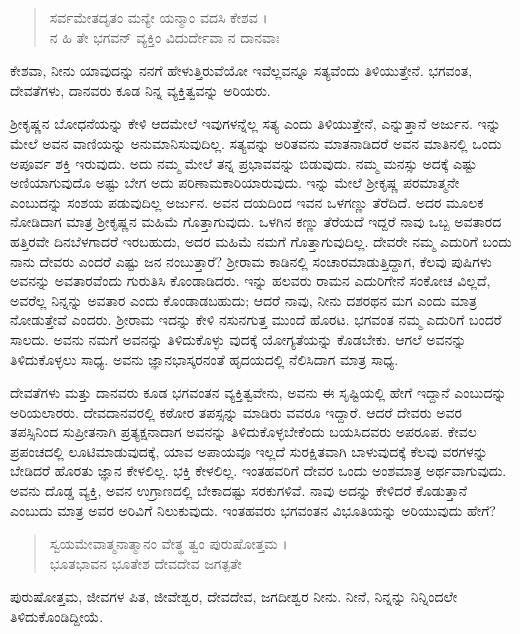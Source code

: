 \begin{verse}
ಸರ್ವಮೇತದೃತಂ ಮನ್ಯೇ ಯನ್ಮಾಂ ವದಸಿ ಕೇಶವ ।\\ನ ಹಿ ತೇ ಭಗವನ್ ವ್ಯಕ್ತಿಂ ವಿದುರ್ದೇವಾ ನ ದಾನವಾಃ 
\end{verse}

{\small ಕೇಶವಾ, ನೀನು ಯಾವುದನ್ನು ನನಗೆ ಹೇಳುತ್ತಿರುವೆಯೋ ಇವೆಲ್ಲವನ್ನೂ ಸತ್ಯವೆಂದು ತಿಳಿಯುತ್ತೇನೆ. ಭಗವಂತ, ದೇವತೆಗಳು, ದಾನವರು ಕೂಡ ನಿನ್ನ ವ್ಯಕ್ತಿತ್ವವನ್ನು ಅರಿಯರು.}

ಶ್ರೀಕೃಷ್ಣನ ಬೋಧನೆಯನ್ನು ಕೇಳಿ ಆದಮೇಲೆ ಇವುಗಳನ್ನೆಲ್ಲ ಸತ್ಯ ಎಂದು ತಿಳಿಯುತ್ತೇನೆ, ಎನ್ನುತ್ತಾನೆ ಅರ್ಜುನ. ಇನ್ನು ಮೇಲೆ ಅವನ ವಾಣಿಯನ್ನು ಅನುಮಾನಿಸುವುದಿಲ್ಲ. ಸತ್ಯವನ್ನು ಅರಿತವನು ಮಾತನಾಡಿದರೆ ಅವನ ಮಾತಿನಲ್ಲಿ ಒಂದು ಅಪೂರ್ವ ಶಕ್ತಿ ಇರುವುದು. ಅದು ನಮ್ಮ ಮೇಲೆ ತನ್ನ ಪ್ರಭಾವವನ್ನು ಬಿಡುವುದು. ನಮ್ಮ ಮನಸ್ಸು ಅದಕ್ಕೆ ಎಷ್ಟು ಅಣಿಯಾಗುವುದೊ ಅಷ್ಟು ಬೇಗ ಅದು ಪರಿಣಾಮಕಾರಿಯಾರುವುದು. ಇನ್ನು ಮೇಲೆ ಶ್ರೀಕೃಷ್ಣ ಪರಮಾತ್ಮನೇ ಎಂಬುದನ್ನು ಸಂಶಯ ಪಡುವುದಿಲ್ಲ ಅರ್ಜುನ. ಅವನ ದಯದಿಂದ ಇವನ ಒಳಗಣ್ಣು ತೆರೆದಿದೆ. ಅದರ ಮೂಲಕ ನೋಡಿದಾಗ ಮಾತ್ರ ಶ್ರೀಕೃಷ್ಣನ ಮಹಿಮೆ ಗೊತ್ತಾಗುವುದು. ಒಳಗಿನ ಕಣ್ಣು ತೆರೆಯದೆ ಇದ್ದರೆ ನಾವು ಒಬ್ಬ ಅವತಾರದ ಹತ್ತಿರವೇ ದಿನಬೆಳಗಾದರೆ ಇರಬಹುದು, ಅದರ ಮಹಿಮೆ ನಮಗೆ ಗೊತ್ತಾಗುವುದಿಲ್ಲ. ದೇವರೇ ನಮ್ಮ ಎದುರಿಗೆ ಬಂದು ನಾನು ದೇವರು ಎಂದರೆ ಎಷ್ಟು ಜನ ನಂಬುತ್ತಾರೆ? ಶ್ರೀರಾಮ ಕಾಡಿನಲ್ಲಿ ಸಂಚಾರಮಾಡುತ್ತಿದ್ದಾಗ, ಕೆಲವು ಪುಷಿಗಳು ಅವನನ್ನು ಅವತಾರವೆಂದು ಗುರುತಿಸಿ ಕೊಂಡಾಡಿದರು. ಇನ್ನು ಹಲವರು ರಾಮನ ಎದುರಿಗೇನೆ ಸಂಕೋಚ ವಿಲ್ಲದೆ, ಅವರೆಲ್ಲ ನಿನ್ನನ್ನು ಅವತಾರ ಎಂದು ಕೊಂಡಾಡಬಹುದು; ಆದರೆ ನಾವು, ನೀನು ದಶರಥನ ಮಗ ಎಂದು ಮಾತ್ರ ನೋಡುತ್ತೇವೆ ಎಂದರು. ಶ್ರೀರಾಮ ಇದನ್ನು ಕೇಳಿ ನಸುನಗುತ್ತ ಮುಂದೆ ಹೊರಟ. ಭಗವಂತ ನಮ್ಮ ಎದುರಿಗೆ ಬಂದರೆ ಸಾಲದು. ಅವನು ನಮಗೆ ಅವನನ್ನು ತಿಳಿದುಕೊಳ್ಳು ವುದಕ್ಕೆ ಯೋಗ್ಯತೆಯನ್ನು ಕೊಡಬೇಕು. ಆಗಲೆ ಅವನನ್ನು ತಿಳಿದುಕೊಳ್ಳಲು ಸಾಧ್ಯ. ಅವನು ಜ್ಞಾನಭಾಸ್ಕರನಂತೆ ಹೃದಯದಲ್ಲಿ ನೆಲಿಸಿದಾಗ ಮಾತ್ರ ಸಾಧ್ಯ.

ದೇವತೆಗಳು ಮತ್ತು ದಾನವರು ಕೂಡ ಭಗವಂತನ ವ್ಯಕ್ತಿತ್ವವೇನು, ಅವನು ಈ ಸೃಷ್ಟಿಯಲ್ಲಿ ಹೇಗೆ ಇದ್ದಾನೆ ಎಂಬುದನ್ನು ಅರಿಯಲಾರರು. ದೇವದಾನವರಲ್ಲಿ ಕಠೋರ ತಪಸ್ಸನ್ನು ಮಾಡಿರು ವವರೂ ಇದ್ದಾರೆ. ಆದರೆ ದೇವರು ಅವರ ತಪಸ್ಸಿನಿಂದ ಸುಪ್ರೀತನಾಗಿ ಪ್ರತ್ಯಕ್ಷನಾದಾಗ ಅವನನ್ನು ತಿಳಿದುಕೊಳ್ಳಬೇಕೆಂದು ಬಯಸಿದವರು ಅಪರೂಪ. ಕೇವಲ ಪ್ರಪಂಚದಲ್ಲಿ ಲೂಟಿಮಾಡುವುದಕ್ಕೆ, ಯಾವ ಅಪಾಯವೂ ಇಲ್ಲದೆ ಸುರಕ್ಷಿತವಾಗಿ ಬಾಳುವುದಕ್ಕೆ ಕೆಲವು ವರಗಳನ್ನು ಬೇಡಿದರೆ ಹೊರತು ಜ್ಞಾನ ಕೇಳಲಿಲ್ಲ. ಭಕ್ತಿ ಕೇಳಲಿಲ್ಲ. ಇಂತಹವರಿಗೆ ದೇವರ ಒಂದು ಅಂಶಮಾತ್ರ ಅರ್ಥವಾಗುವುದು. ಅವನು ದೊಡ್ಡ ವ್ಯಕ್ತಿ, ಅವನ ಉಗ್ರಾಣದಲ್ಲಿ ಬೇಕಾದಷ್ಟು ಸರಕುಗಳಿವೆ. ನಾವು ಅದನ್ನು ಕೇಳಿದರೆ ಕೊಡುತ್ತಾನೆ ಎಂಬುದು ಮಾತ್ರ ಅವರ ಅರಿವಿಗೆ ನಿಲುಕುವುದು. ಇಂತಹವರು ಭಗವಂತನ ವಿಭೂತಿಯನ್ನು ಅರಿಯುವುದು ಹೇಗೆ?

\begin{verse}
ಸ್ವಯಮೇವಾತ್ಮನಾತ್ಮಾನಂ ವೇತ್ಥ ತ್ವಂ ಪುರುಷೋತ್ತಮ ।\\ಭೂತಭಾವನ ಭೂತೇಶ ದೇವದೇವ ಜಗತ್ಪತೇ 
\end{verse}

{\small ಪುರುಷೋತ್ತಮ, ಜೀವಗಳ ಪಿತ, ಜೀವೇಶ್ವರ, ದೇವದೇವ, ಜಗದೀಶ್ವರ ನೀನು. ನೀನೆ, ನಿನ್ನನ್ನು ನಿನ್ನಿಂದಲೇ ತಿಳಿದುಕೊಂಡಿದ್ದೀಯೆ.}

